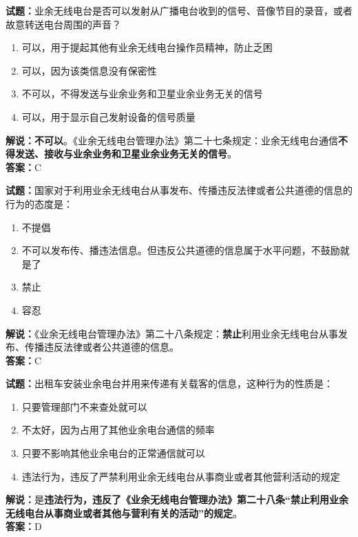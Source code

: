 \documentclass{ctexbook}
\begin{document}
\vspace{1em}

\textbf{试题：}业余无线电台是否可以发射从广播电台收到的信号、音像节目的录音，或者故意转送电台周围的声音？
\begin{enumerate}[leftmargin=3em]
  \item 可以，用于提起其他有业余无线电台操作员精神，防止乏困
  \item 可以，因为该类信息没有保密性
  \item 不可以，不得发送与业余业务和卫星业余业务无关的信号
  \item 可以，用于显示自己发射设备的信号质量
\end{enumerate}
\textbf{解说：不可以}。《业余无线电台管理办法》第二十七条规定：业余无线电台通信\textbf{不得发送、接收与业余业务和卫星业余业务无关的信号}。\\\noindent\textbf{答案：}C

\vspace{1em}

\textbf{试题：}国家对于利用业余无线电台从事发布、传播违反法律或者公共道德的信息的行为的态度是：
\begin{enumerate}[leftmargin=3em]
  \item 不提倡
  \item 不可以发布传、播违法信息。但违反公共道德的信息属于水平问题，不鼓励就是了
  \item 禁止
  \item 容忍
\end{enumerate}
\noindent\textbf{解说：}《业余无线电台管理办法》第二十八条规定：\textbf{禁止}利用业余无线电台从事发布、传播违反法律或者公共道德的信息。\\\noindent\textbf{答案：}C

\vspace{1em}

\textbf{试题：}出租车安装业余电台并用来传递有关载客的信息，这种行为的性质是：
\begin{enumerate}[leftmargin=3em]
  \item 只要管理部门不来查处就可以
  \item 不太好，因为占用了其他业余电台通信的频率
  \item 只要不影响其他业余电台的正常通信就可以
  \item 违法行为，违反了严禁利用业余无线电台从事商业或者其他营利活动的规定%
\end{enumerate}
\noindent\textbf{解说：}是\textbf{违法行为，违反了《业余无线电台管理办法》第二十八条“禁止利用业余无线电台从事商业或者其他与营利有关的活动”的规定}。\\\noindent\textbf{答案：}D
\end{document}
